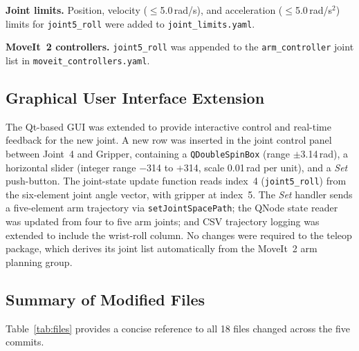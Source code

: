 \documentclass[conference]{IEEEtran}
\begin{document}
	\textbf{Joint limits.}
	Position, velocity ($\leq$5.0\,rad/s), and acceleration
	($\leq$5.0\,rad/s$^2$) limits for \texttt{joint5\_roll} were added
	to \texttt{joint\_limits.yaml}.
	
	\textbf{MoveIt~2 controllers.}
	\texttt{joint5\_roll} was appended to the \texttt{arm\_controller}
	joint list in \texttt{moveit\_controllers.yaml}.
	
	\subsection{Graphical User Interface Extension}
	
	The Qt-based GUI was extended to provide interactive control and
	real-time feedback for the new joint. A new row was inserted in the
	joint control panel between Joint~4 and Gripper, containing a
	\texttt{QDoubleSpinBox} (range $\pm$3.14\,rad), a horizontal slider
	(integer range $-$314 to $+$314, scale 0.01\,rad per unit), and a
	\textit{Set} push-button. The joint-state update function reads
	index~4 (\texttt{joint5\_roll}) from the six-element joint angle
	vector, with gripper at index~5. The \textit{Set} handler sends a
	five-element arm trajectory via \texttt{setJointSpacePath}; the QNode
	state reader was updated from four to five arm joints; and CSV
	trajectory logging was extended to include the wrist-roll column. No
	changes were required to the teleop package, which derives its joint
	list automatically from the MoveIt~2 arm planning group.
	
	\subsection{Summary of Modified Files}
	
	Table~\ref{tab:files} provides a concise reference to all 18 files
	changed across the five commits.
	
\end{document}

